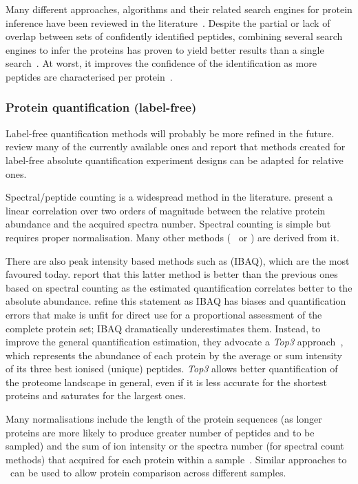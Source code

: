Many different approaches, algorithms and their related search engines
for protein inference have been reviewed in the literature~.
Despite the partial or lack of overlap between
sets of confidently identified peptides,
combining several search engines to infer the proteins
has proven to yield better results than a single search~.
At worst, it improves the confidence of the identification
as more peptides are characterised per protein~.\mybr\

\subsubsection{Protein quantification (label-free)}\label{subsubsec:protQuantLB}

Label-free quantification methods will probably be more refined in the future.
\citet{Nikolov2012-hq} review many of the currently available ones and report that
methods created for label-free absolute quantification experiment designs
can be adapted for relative ones.\mybr\

Spectral/peptide counting is a widespread method in the literature.
\citet{Liu2004-cj} present a linear correlation over two orders of magnitude
between the relative protein abundance and the acquired spectra number.
Spectral counting is simple but requires proper normalisation.
Many other methods (\eg\  or )
are derived from it.

There are also peak intensity based methods such as  (\gls{IBAQ}),
which are the most favoured today.
\citet{Arike2012} report that this latter method is better than the previous ones
based on spectral counting as the estimated quantification correlates better to
the absolute abundance.
\citet{TOP3isbetter} refine this statement
as \gls{IBAQ} has biases and quantification errors
that make is unfit for direct
use for a proportional assessment of the complete protein set;
\gls{IBAQ} dramatically underestimates them.
Instead, to improve the general quantification estimation,
they advocate a \emph{Top3} approach~,
which represents the abundance of each protein by the average or sum intensity of
its three best ionised (unique) peptides.
\emph{Top3} allows better quantification of the proteome landscape in general,
even if it is less accurate for the shortest proteins and
saturates for the largest ones.\mybr\

Many normalisations
include the length of the protein sequences
(as longer proteins are more likely to produce greater number of peptides and
to be sampled) and the sum of ion intensity or
the spectra number (for spectral count methods)
that acquired for each protein within a sample~.
Similar approaches to \Rnaseq\ can be used to allow protein comparison
across different samples.\mybr\

